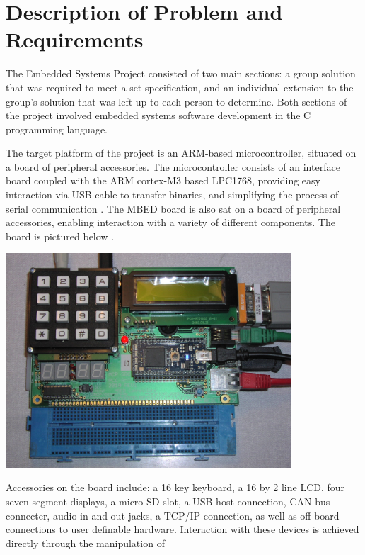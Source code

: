 \section{Description of Problem and Requirements}

The Embedded Systems Project consisted of two main sections: a group solution 
that was required to meet a set specification, and an individual extension to 
the group's solution that was left up to each person to determine. 
Both sections of the project involved embedded systems software development in 
the C programming language. 
\par\bigskip\noindent
The target platform of the project is an ARM-based microcontroller, 
situated on a board of peripheral accessories. 
The microcontroller consists of 
an interface board coupled with the ARM cortex-M3 based LPC1768, providing easy 
interaction via USB cable to transfer binaries, and simplifying the process of 
serial communication \cite{how-mbed-works}.
The MBED board is also sat on a board of peripheral accessories, enabling 
interaction with a variety of different components. The board is pictured below
\cite{mbed-picture}.
\begin{center}
\includegraphics[width=0.80\textwidth]{./mbed_board}
\end{center}
Accessories on the board include: a 16 key keyboard, 
a 16 by 2 line LCD, four seven segment displays, a micro SD slot, a USB host 
connection, CAN bus connecter, audio in and out jacks, a TCP/IP connection, as 
well as off board connections to user definable hardware. 
Interaction with these devices is achieved directly through the manipulation of 
